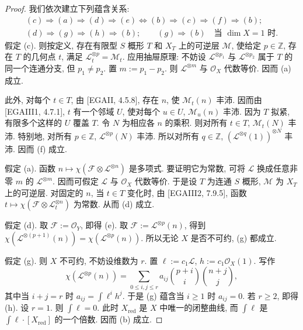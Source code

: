 \begin{proof}
我们依次建立下列蕴含关系:
\[\begin{gathered}
(c)\Longrightarrow(a)\Longrightarrow(d)\Longrightarrow(e)\Longleftrightarrow(b)\Longrightarrow(c)\Longrightarrow(f)\Longrightarrow(b);\\
(d)\Longrightarrow(g)\Longrightarrow(h)\Longrightarrow(b);\qquad
(g)\Longrightarrow(b)\quad\text{当 $\dim X=1$ 时}.
\end{gathered}\]
假定 (c). 则按定义, 存在有限型 $S$ 概形 $T$ 和 $X_T$ 上的可逆层 $\mathcal M$, 使给定 $p\in\mathbb Z$, 存在 $T$ 的几何点 $t$, 满足 $\mathcal L_t^{\otimes p}=\mathcal M_t$. 应用抽屉原理: 不妨设 $\mathcal L^{\otimes p_1}$ 与 $\mathcal L^{\otimes p_2}$ 属于 $T$ 的同一个连通分支, 但 $p_1\ne p_2$. 置 $m:=p_1-p_2$. 则 $\mathcal L^{\otimes m}$ 与 $\mathcal O_X$ 代数等价. 因而 (a) 成立.

此外, 对每个 $t\in T$, 由 [EGAII, 4.5.8], 存在 $n$, 使 $\mathcal M_t(n)$ 丰沛. 因而由 [EGAIII1, 4.7.1], $t$ 有一个邻域 $U$, 使对每个 $u\in U$, $\mathcal M_u(n)$ 丰沛. 因为 $T$ 拟紧, 有限多个这样的 $U$ 覆盖 $T$. 令 $N$ 为相应各 $n$ 的乘积. 则对所有 $t\in T$, $\mathcal M_t(N)$ 丰沛. 特别地, 对所有 $p\in\mathbb Z$, $\mathcal L^{\otimes p}(N)$ 丰沛. 所以对所有 $q\in\mathbb Z$, $(\mathcal L^{\otimes q}(1))^{\otimes N}$ 丰沛. 因而 (f) 成立.

假定 (a). 函数 $n\mapsto\chi(\mathcal F\otimes\mathcal L^{\otimes n})$ 是多项式. 要证明它为常数, 可将 $\mathcal L$ 换成任意非零 $m$ 的 $\mathcal L^{\otimes m}$. 因而可假定 $\mathcal L$ 与 $\mathcal O_X$ 代数等价. 于是设 $T$ 为连通 $S$ 概形, $\mathcal M$ 为 $X_T$ 上的可逆层. 对固定的 $n$, 当 $t\in T$ 变化时, 由 [EGAIII2, 7.9.5], 函数 $t\mapsto\chi(\mathcal F\otimes\mathcal L_t^{\otimes n})$ 为常数. 从而 (d) 成立.

假定 (d). 取 $\mathcal F:=\mathcal O_Y$, 即得 (e). 取 $\mathcal F:=\mathcal L^{\otimes p}(n)$, 得到 $\chi(\mathcal L^{\otimes(p+1)}(n))=\chi(\mathcal L^{\otimes p}(n))$. 所以无论 $X$ 是否不可约, (g) 都成立.

假定 (g). 则 $X$ 不可约, 不妨设维数为 $r$. 置 $\ell:=c_1\mathcal L$, $h:=c_1\mathcal O_X(1)$. 写作
\[\chi(\mathcal L^{\otimes p}(n))=\sum_{0\leq i,j\leq r}a_{ij}\binom{p+i}{i}\binom{n+j}{j},\]
其中当 $i+j=r$ 时 $a_{ij}=\int\ell^ih^j$. 于是 (g) 蕴含当 $i\geq1$ 时 $a_{ij}=0$. 若 $r\geq2$, 即得 (h). 设 $r=1$. 则 $\int\ell=0$. 此时 $X_{\mathrm{red}}$ 是 $X$ 中唯一的闭整曲线, 而 $\int\ell$ 是 $\int\ell\cdot[X_{\mathrm{red}}]$ 的一个倍数. 因而 (b) 成立.


\end{proof}

